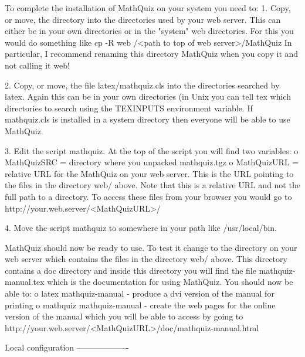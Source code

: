 \documentclass[svgnames]{article}
\begin{document}
To complete the installation of MathQuiz on your system you need to:
    1. Copy, or move, the directory into the directories used by your web server. This
       can either be in your own directories or in the "system" web directories. For this
       you would do something like
           cp -R web /<path to top of web server>/MathQuiz
       In particular, I recommend renaming this directory MathQuiz when you copy it and
       not calling it web!

    2. Copy, or move, the file latex/mathquiz.cls into the directories searched by latex.
       Again this can be in your own directories (in Unix you can tell tex which
       directories to search using the TEXINPUTS environment variable. If mathquiz.cls is
       installed in a system directory then everyone will be able to use MathQuiz.

    3. Edit the script mathquiz. At the top of the script you will find two variables:
        o MathQuizSRC = directory where you unpacked mathquiz.tgz
        o MathQuizURL = relative URL for the MathQuiz on your web server. This is the
              URL pointing to the files in the directory web/ above. Note that this is a
              relative URL and not the full path to a directory. To access these files
              from your browser you would go to
                http://your.web.server/<MathQuizURL>/

    4. Move the script mathquiz to somewhere in your path like /usr/local/bin.

MathQuiz should now be ready to use. To test it change to the directory on your web
server which contains the files in the directory web/ above. This directory contains
a doc directory and inside this directory you will find the file mathquiz-manual.tex
which is the documentation for using MathQuiz. You should now be able to:
    o latex mathquiz-manual     - produce a dvi version of the manual for printing
    o mathquiz mathquiz-manual  - create the web pages for the online version of the
        manual which you will be able to access by going to
          http://your.web.server/<MathQuizURL>/doc/mathquiz-manual.html

Local configuration
-------------------
\end{document}
